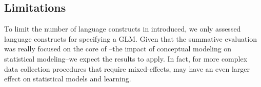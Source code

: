 \subsection{Limitations}
To limit the number of language constructs in \rTisane introduced, we only
assessed language constructs for specifying a GLM. Given that the summative
evaluation was really focused on the core of \rTisane--the impact of conceptual
modeling on statistical modeling--we expect the results to apply. In fact, for
more complex data collection procedures that require mixed-effects, \rTisane may
have an even larger effect on statistical models and learning. 